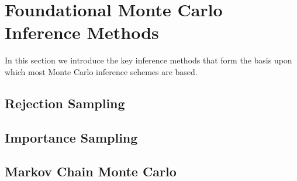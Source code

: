 
\section{Foundational Monte Carlo Inference Methods}
\label{sec:inf:foundation}

In this section we introduce the key inference methods that form
the basis upon which most Monte Carlo inference schemes are based.

\subsection{Rejection Sampling}
\label{sec:inf:foundation:rejection}

\subsection{Importance Sampling}
\label{sec:inf:foundation:importance}

\subsection{Markov Chain Monte Carlo}
\label{sec:inf:foundation:mcmc}